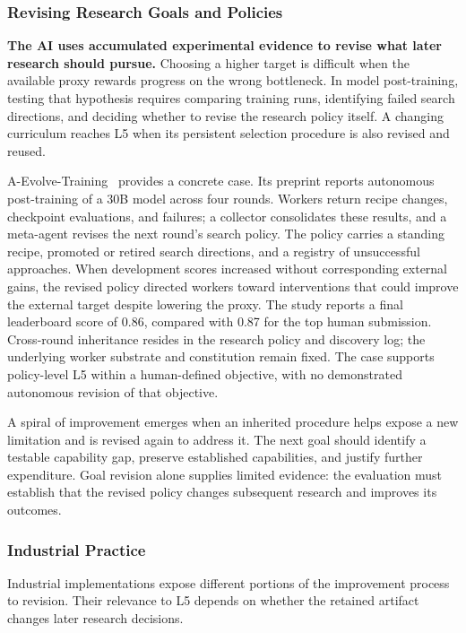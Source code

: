 \subsubsection{Revising Research Goals and Policies}
\noindent\textbf{The AI uses accumulated experimental evidence to revise what later research should pursue.} Choosing a higher target is difficult when the available proxy rewards progress on the wrong bottleneck. In model post-training, testing that hypothesis requires comparing training runs, identifying failed search directions, and deciding whether to revise the research policy itself. A changing curriculum reaches L5 when its persistent selection procedure is also revised and reused.

A-Evolve-Training~\cite{shi2026aevolvetraining} provides a concrete case. Its preprint reports autonomous post-training of a 30B model across four rounds. Workers return recipe changes, checkpoint evaluations, and failures; a collector consolidates these results, and a meta-agent revises the next round's search policy. The policy carries a standing recipe, promoted or retired search directions, and a registry of unsuccessful approaches. When development scores increased without corresponding external gains, the revised policy directed workers toward interventions that could improve the external target despite lowering the proxy. The study reports a final leaderboard score of 0.86, compared with 0.87 for the top human submission. Cross-round inheritance resides in the research policy and discovery log; the underlying worker substrate and constitution remain fixed. The case supports policy-level L5 within a human-defined objective, with no demonstrated autonomous revision of that objective.

A spiral of improvement emerges when an inherited procedure helps expose a new limitation and is revised again to address it. The next goal should identify a testable capability gap, preserve established capabilities, and justify further expenditure. Goal revision alone supplies limited evidence: the evaluation must establish that the revised policy changes subsequent research and improves its outcomes.

\subsubsection{Industrial Practice}
Industrial implementations expose different portions of the improvement process to revision. Their relevance to L5 depends on whether the retained artifact changes later research decisions.


